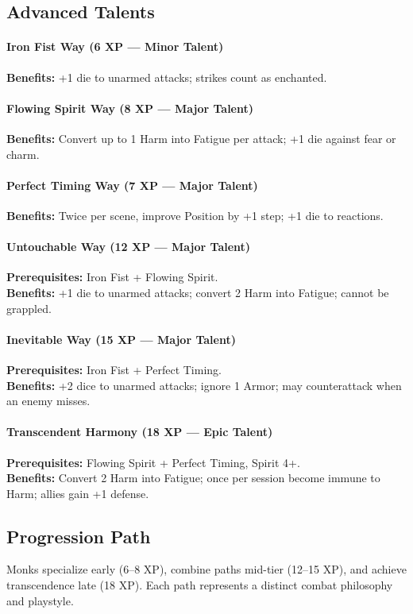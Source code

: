 \subsection*{Advanced Talents}
\paragraph{Iron Fist Way (6 XP --- Minor Talent)} 
\textbf{Benefits:} +1 die to unarmed attacks; strikes count as enchanted.

\paragraph{Flowing Spirit Way (8 XP --- Major Talent)} 
\textbf{Benefits:} Convert up to 1 Harm into Fatigue per attack; +1 die against fear or charm.

\paragraph{Perfect Timing Way (7 XP --- Major Talent)} 
\textbf{Benefits:} Twice per scene, improve Position by +1 step; +1 die to reactions.

\paragraph{Untouchable Way (12 XP --- Major Talent)} 
\textbf{Prerequisites:} Iron Fist + Flowing Spirit. \\
\textbf{Benefits:} +1 die to unarmed attacks; convert 2 Harm into Fatigue; cannot be grappled.

\paragraph{Inevitable Way (15 XP --- Major Talent)} 
\textbf{Prerequisites:} Iron Fist + Perfect Timing. \\
\textbf{Benefits:} +2 dice to unarmed attacks; ignore 1 Armor; may counterattack when an enemy misses.

\paragraph{Transcendent Harmony (18 XP --- Epic Talent)} 
\textbf{Prerequisites:} Flowing Spirit + Perfect Timing, Spirit 4+. \\
\textbf{Benefits:} Convert 2 Harm into Fatigue; once per session become immune to Harm; allies gain +1 defense.

\subsection*{Progression Path}
Monks specialize early (6--8 XP), combine paths mid-tier (12--15 XP), and achieve transcendence late (18 XP). Each path represents a distinct combat philosophy and playstyle.